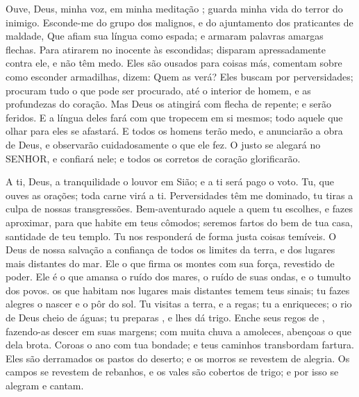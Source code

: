 
{\PP 
  Ouve, Deus, minha voz, em minha meditação
{} ; guarda minha vida do terror do inimigo.
  Esconde-me do grupo dos malignos, e do ajuntamento dos praticantes de maldade,
  Que afiam sua língua como
{} espada; e armaram palavras amargas
{} flechas.
  Para atirarem no inocente às escondidas; disparam apressadamente contra ele, e não têm medo.
  Eles são ousados para
{} coisas más, comentam sobre como esconder armadilhas,
{} dizem: Quem as verá?
  Eles buscam por perversidades; procuram tudo o que pode ser procurado, até o interior de
{} homem, e as profundezas do coração.
  Mas Deus os atingirá com flecha de repente; e
{} serão feridos.
  E a língua deles fará com que tropecem em si mesmos; todo aquele que olhar para eles se afastará.
  E todos os homens terão medo, e anunciarão a obra de Deus, e observarão cuidadosamente o que ele fez.
  O justo se alegará no SENHOR, e confiará nele; e todos os corretos de coração
{} glorificarão.
\par }


{\PP 
  A ti, Deus,
{} a tranquilidade
{} o louvor em Sião; e a ti será pago o voto.
  Tu, que ouves as orações; toda carne virá a ti.
  Perversidades têm me dominado,
{} tu tiras a culpa de nossas transgressões.
  Bem-aventurado
{} aquele a quem tu escolhes, e
{} fazes aproximar, para que habite em teus cômodos; seremos fartos do bem de tua casa,
{} santidade de teu templo.
  Tu nos responderá de forma justa
{} coisas temíveis. O Deus de nossa salvação
{} a confiança de todos os limites da terra, e dos lugares mais distantes do mar.
  Ele
{} o que firma os montes com sua força, revestido de poder.
  Ele é o que amansa o ruído dos mares, o ruído de suas ondas, e o tumulto dos povos.
   os que habitam nos lugares mais distantes temem teus sinais; tu fazes alegres o nascer e o pôr do sol.
  Tu visitas a terra, e a regas; tu a enriqueces; o rio de Deus
{} cheio de águas; tu preparas
{},  e lhes dá trigo.
  Enche seus regos de
{}, fazendo-as descer em suas margens; com muita chuva a amoleces,
{} abençoas o que dela brota.
  Coroas o ano com tua bondade; e teus caminhos transbordam fartura.
  Eles são derramados
{} os pastos do deserto; e os morros se revestem de alegria.
  Os campos se revestem de rebanhos, e os vales são cobertos de trigo; e por isso se alegram e cantam.
\par }

